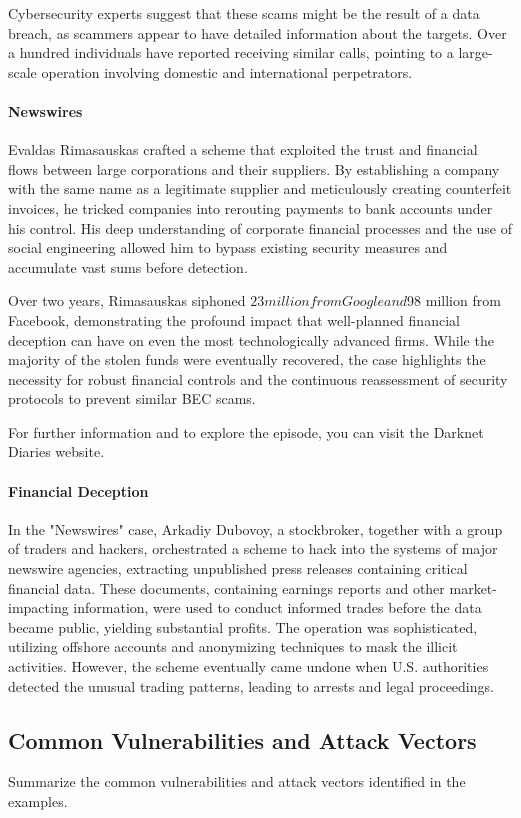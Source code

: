 \documentclass[11pt]{article}
\begin{document}
Cybersecurity experts suggest that these scams might be the result of a data breach, as scammers appear to have detailed information about the targets. Over a hundred individuals have reported receiving similar calls, pointing to a large-scale operation involving domestic and international perpetrators.
\paragraph*{Newswires}
Evaldas Rimasauskas crafted a scheme that exploited the trust and financial flows between large corporations and their suppliers. By establishing a company with the same name as a legitimate supplier and meticulously creating counterfeit invoices, he tricked companies into rerouting payments to bank accounts under his control. His deep understanding of corporate financial processes and the use of social engineering allowed him to bypass existing security measures and accumulate vast sums before detection.

Over two years, Rimasauskas siphoned $23 million from Google and $98 million from Facebook, demonstrating the profound impact that well-planned financial deception can have on even the most technologically advanced firms. While the majority of the stolen funds were eventually recovered, the case highlights the necessity for robust financial controls and the continuous reassessment of security protocols to prevent similar BEC scams.

For further information and to explore the episode, you can visit the Darknet Diaries website.
\paragraph*{Financial Deception}
In the "Newswires" case, Arkadiy Dubovoy, a stockbroker, together with a group of traders and hackers, orchestrated a scheme to hack into the systems of major newswire agencies, extracting unpublished press releases containing critical financial data. These documents, containing earnings reports and other market-impacting information, were used to conduct informed trades before the data became public, yielding substantial profits. The operation was sophisticated, utilizing offshore accounts and anonymizing techniques to mask the illicit activities. However, the scheme eventually came undone when U.S. authorities detected the unusual trading patterns, leading to arrests and legal proceedings.

\subsection{Common Vulnerabilities and Attack Vectors}
Summarize the common vulnerabilities and attack vectors identified in the examples.
\end{document}
